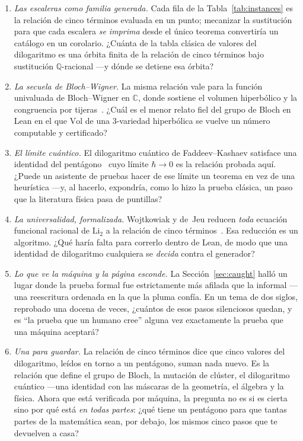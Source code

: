 \documentclass[11pt]{article}
\newcommand{\Li}{\mathrm{Li}_2}
\begin{document}
\begin{enumerate}
\item \emph{Las escaleras como familia generada.} Cada fila de la Tabla~\ref{tab:instances}
es la relaci\'on de cinco t\'erminos evaluada en un punto; mecanizar la sustituci\'on para que
cada escalera \emph{se imprima} desde el \'unico teorema convertir\'ia un cat\'alogo en un
corolario. ¿Cu\'anta de la tabla cl\'asica de valores del dilogaritmo es una \'orbita finita
de la relaci\'on de cinco t\'erminos bajo sustituci\'on $\mathbb{Q}$-racional ---y d\'onde se
detiene esa \'orbita?
\item \emph{La secuela de Bloch--Wigner.} La misma relaci\'on vale para la funci\'on
univaluada de Bloch--Wigner en $\mathbb{C}$, donde sostiene el volumen hiperb\'olico y la
congruencia por tijeras~\cite{suslin,neumannzagier,goncharov}. ¿Cu\'al es el menor relato
fiel del grupo de Bloch en Lean en el que $\mathrm{Vol}$ de una $3$-variedad hiperb\'olica se
vuelve un n\'umero computable y certificado?
\item \emph{El l\'imite cu\'antico.} El dilogaritmo cu\'antico de Faddeev--Kashaev satisface
una identidad del pent\'agono~\cite{faddeevkashaev} cuyo l\'imite $\hbar\to0$ es la relaci\'on
probada aqu\'i. ¿Puede un asistente de pruebas hacer de ese l\'imite un teorema en vez de una
heur\'istica ---y, al hacerlo, expondr\'ia, como lo hizo la prueba cl\'asica, un paso que la
literatura f\'isica pasa de puntillas?
\item \emph{La universalidad, formalizada.} Wojtkowiak y de~Jeu reducen \emph{toda} ecuaci\'on
funcional racional de $\Li$ a la relaci\'on de cinco t\'erminos~\cite{wojtkowiak,dejeu}. Esa
reducci\'on es un algoritmo. ¿Qu\'e har\'ia falta para correrlo dentro de Lean, de modo que
una identidad de dilogaritmo cualquiera se \emph{decida} contra el generador?
\item \emph{Lo que ve la m\'aquina y la p\'agina esconde.} La Secci\'on~\ref{sec:caught}
hall\'o un lugar donde la prueba formal fue estrictamente m\'as afilada que la informal ---una
reescritura ordenada en la que la pluma conf\'ia. En un tema de dos siglos, reprobado una
docena de veces, ¿cu\'antos de esos pasos silenciosos quedan, y es ``la prueba que un humano
cree'' alguna vez exactamente la prueba que una m\'aquina aceptar\'a?
\item \emph{Una para guardar.} La relaci\'on de cinco t\'erminos dice que cinco valores del
dilogaritmo, le\'idos en torno a un pent\'agono, suman nada nuevo. Es la relaci\'on que define
el grupo de Bloch, la mutaci\'on de cl\'uster, el dilogaritmo cu\'antico ---una identidad con
las m\'ascaras de la geometr\'ia, el \'algebra y la f\'isica. Ahora que est\'a verificada por
m\'aquina, la pregunta no es si es cierta sino por qu\'e est\'a \emph{en todas partes}: ¿qu\'e
tiene un pent\'agono para que tantas partes de la matem\'atica sean, por debajo, los mismos
cinco pasos que te devuelven a casa?
\end{enumerate}
\end{document}

